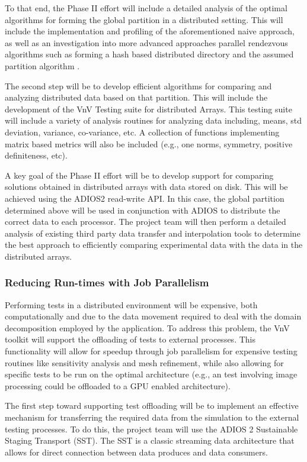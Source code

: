 To that end, the Phase II effort will include a detailed analysis of the optimal algorithms for forming the global partition in a distributed setting. This will include the implementation and profiling of the aforementioned naive approach, as well as an investigation into more advanced approaches parallel rendezvous algorithms such as forming a hash based distributed directory \cite{hpre-nine} and the assumed partition algorithm \cite{hypre-assumed}. 

The second step will be to develop efficient algorithms for comparing and analyzing distributed data based on that partition. This will include the development of the VnV Testing suite for distributed Arrays. This testing suite will include a variety of analysis routines for analyzing data including, means, std deviation, variance, co-variance, etc. A collection of functions implementing matrix based metrics will also be included (e.g., one norms, symmetry, positive definiteness, etc). 

A key goal of the Phase II effort will be to develop support for comparing solutions obtained in distributed arrays with data stored on disk. This will be achieved using the ADIOS2 read-write API. In this case, the global partition determined above will be used in conjunction with ADIOS to distribute the correct data to each processor. The project team will then perform a detailed analysis of existing third party data transfer and interpolation tools to determine the best approach to efficiently comparing experimental data with the data in the distributed arrays. 

\subsubsection{Reducing Run-times with Job Parallelism}

Performing \VV tests in a distributed environment will be expensive, both computationally and due to the data movement required to deal with the domain decomposition employed by the application. To address this problem, the VnV toolkit will support the offloading of tests to external processes. This functionality will allow for speedup through job parallelism for expensive testing routines like sensitivity analysis and mesh refinement, while also allowing for specific tests to be run on the optimal architecture (e.g., an test involving image processing could be offloaded to a GPU enabled architecture).  

The first step toward supporting test offloading will be to implement an effective mechanism for transferring the required 
data from the simulation to the external testing processes. To do this, the project team will use the ADIOS 2 Sustainable Staging Transport (SST). The SST is a classic streaming data architecture that allows for direct connection between data produces and data consumers. 

